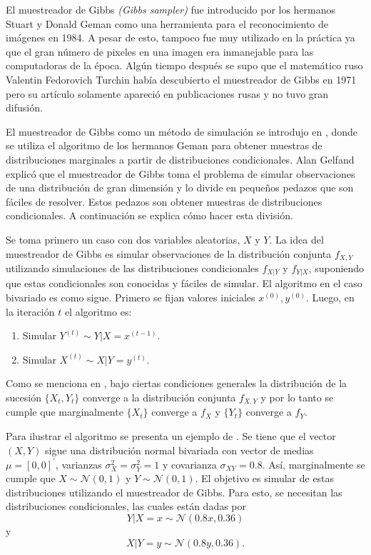 \documentclass[11pt,a4paper]{article}
\begin{document}
El muestreador de Gibbs \textit{(Gibbs sampler)} fue introducido por los hermanos Stuart y Donald Geman como una herramienta para el reconocimiento de imágenes en 1984. A pesar de esto, tampoco fue muy utilizado en la práctica ya que el gran número de pixeles en una imagen era inmanejable para las computadoras de la época. Algún tiempo después se supo que el matemático ruso Valentin Fedorovich Turchin había descubierto el muestreador de Gibbs en 1971 pero su artículo solamente apareció en publicaciones rusas y no tuvo gran difusión.

El muestreador de Gibbs como un método de simulación se introdujo en \citet{gelfand_smith}, donde se utiliza el algoritmo de los hermanos Geman para obtener muestras de distribuciones marginales a partir de distribuciones condicionales. Alan Gelfand explicó que el muestreador de Gibbs toma el problema de simular observaciones de una distribución de gran dimensión y lo divide en pequeños pedazos que son fáciles de resolver. Estos pedazos son obtener muestras de distribuciones condicionales. A continuación se explica cómo hacer esta división.

Se toma primero un caso con dos variables aleatorias, $X$ y $Y$. La idea del muestreador de Gibbs es simular observaciones de la distribución conjunta $f_{X, Y}$ utilizando simulaciones de las distribuciones condicionales $f_{X|Y}$ y $f_{Y|X}$, suponiendo que estas condicionales son conocidas y fáciles de simular. El algoritmo en el caso bivariado es como sigue. Primero se fijan valores iniciales $x^{(0)}, y^{(0)}$. Luego, en la iteración $t$ el algoritmo es:
\begin{enumerate}
\item Simular $Y^{(t)} \sim Y|X = x^{(t-1)}$.
\item Simular $X^{(t)} \sim X|Y = y^{(t)}$.
\end{enumerate}

Como se menciona en \citet{casella_gs}, bajo ciertas condiciones generales la distribución de la sucesión $\lbrace X_t, Y_t \rbrace$ converge a la distribución conjunta $f_{X, Y}$ y por lo tanto se cumple que marginalmente $\lbrace X_t \rbrace$ converge a $f_X$ y $\lbrace Y_t \rbrace$ converge a $f_Y$.

Para ilustrar el algoritmo se presenta un ejemplo de \citet{casella}. Se tiene que el vector $(X, Y)$ sigue una distribución normal bivariada con vector de medias $\mu = [0, 0]^\prime$, varianzas $\sigma^2_X = \sigma^2_Y = 1$ y covarianza $\sigma_{XY} = 0.8$. Así, marginalmente se cumple que $X \sim \mathcal{N}(0, 1)$ y $Y \sim \mathcal{N}(0, 1)$. El objetivo es simular de estas distribuciones utilizando el muestreador de Gibbs. Para esto, se necesitan las distribuciones condicionales, las cuales están dadas por $$Y|X = x \sim \mathcal{N}(0.8 x, 0.36)$$ y $$X|Y = y \sim \mathcal{N}(0.8 y, 0.36).$$
\end{document}
